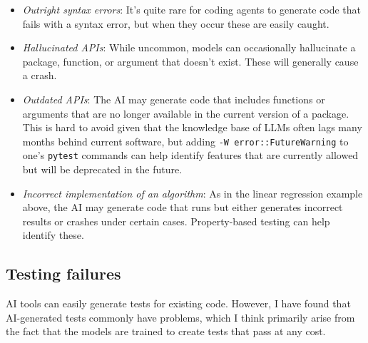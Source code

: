 \begin{itemize}
\item \textit{Outright syntax errors}: It's quite rare for coding agents to generate code that fails with a syntax error, but when they occur these are easily caught.
\item \textit{Hallucinated APIs}: While uncommon, models can occasionally hallucinate a package, function, or argument that doesn't exist.  These will generally cause a crash.
\item \textit{Outdated APIs}: The AI may generate code that includes functions or arguments that are no longer available in the current version of a package.  This is hard to avoid given that the knowledge base of LLMs often lags many months behind current software, but adding \texttt{-W error::FutureWarning} to one's \texttt{pytest} commands can help identify features that are currently allowed but will be deprecated in the future.
\item \textit{Incorrect implementation of an algorithm}: As in the linear regression example above, the AI may generate code that runs but either generates incorrect results or crashes under certain cases.  Property-based testing can help identify these.
\end{itemize}

\subsection{Testing failures}

AI tools can easily generate tests for existing code.  However, I have found that AI-generated tests commonly have problems, which I think primarily arise from the fact that the models are trained to create tests that pass at any cost.

